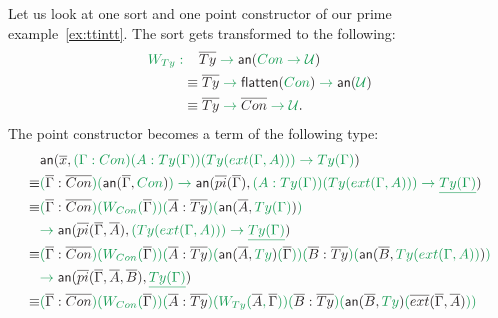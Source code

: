 \begin{example}
Let us look at one sort and one point constructor of our prime example~\ref{ex:ttintt}.
The sort  gets transformed to the following:
\begin{align*}
\grm{W_{\mathop{Ty}} :} 
&\phantom{\equiv~} \grm{\blm{\overline{Ty}} \to \annotate{\mathop{Con} \to \UU} } \\
&\equiv \grm{\blm{\overline{Ty}} \to \flatten{\mathop{Con}} \to \annotate{\UU}} \\
&\equiv \grm{\blm{\overline{Ty}} \to \blm{\overline{Con}} \to \UU} \text{.}
\end{align*}
The point constructor
becomes a term  of the following type:
\begin{align*}
& \grm{\anntwo{\overline{x}}{(\Gamma : \mathop{Con})(A : \mathop{Ty}(\Gamma))(\mathop{Ty}(\mathop{ext}(\Gamma, A)))
	\to \mathop{Ty}(\Gamma)}} \\
\equiv & \grm{(\blm{\overline{\Gamma} : \overline{Con}})(\anntwo{\overline{\Gamma}}{\mathop{Con}})
	\to \anntwo{\overline{pi}(\overline{\Gamma})}{(A : \mathop{Ty}(\Gamma))(\mathop{Ty}(\mathop{ext}(\Gamma, A))) \to \underline{\mathop{Ty}(\Gamma)}}} \\
\equiv & \grm{
	(\blm{\overline{\Gamma} : \overline{Con}})(W_{\mathop{Con}}(\blm{\overline{\Gamma}}))
	(\blm{\overline{A} : \overline{Ty}})(\anntwo{\overline{A}}{\mathop{Ty}(\Gamma)}) } \\
& \grm{
	\to \anntwo{\overline{pi}(\overline{\Gamma}, \overline{A})}{(\mathop{Ty}(\mathop{ext}(\Gamma, A))) \to \underline{\mathop{Ty}(\Gamma)}}
} \\
\equiv & \grm{
	(\blm{\overline{\Gamma} : \overline{Con}})(W_{\mathop{Con}}(\blm{\overline{\Gamma}}))
	(\blm{\overline{A} : \overline{Ty}})(\anntwo{\overline{A}}{\mathop{Ty}}(\blm{\overline{\Gamma}}))
	(\blm{\overline{B} : \overline{Ty}})(\anntwo{\overline{B}}{\mathop{Ty}(\mathop{ext}(\Gamma, A))}) } \\
& \grm{
	\to \anntwo{\overline{pi}(\overline{\Gamma}, \overline{A}, \overline{B})}{\underline{Ty(\Gamma)}}
} \\
\equiv & \grm{
	(\blm{\overline{\Gamma} : \overline{Con}})(W_{\mathop{Con}}(\blm{\overline{\Gamma}}))
	(\blm{\overline{A} : \overline{Ty}})(W_{\mathop{Ty}}(\blm{\overline{A}}, \blm{\overline{\Gamma}}))
	(\blm{\overline{B} : \overline{Ty}})(\anntwo{\overline{B}}{\mathop{Ty}}(\blm{\overline{ext}(\overline{\Gamma}, \overline{A})}))
}
\end{align*}
\end{example}
